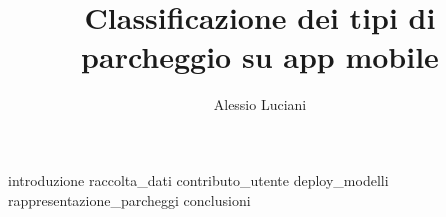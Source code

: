 \documentclass[binding=0.6cm,Lau,noexaminfo]{sapthesis}
\title{Classificazione dei tipi di parcheggio su app mobile} \author{Alessio Luciani}
\begin{document}
\frontmatter
\maketitle
\dedication{Alla mia famiglia}
\tableofcontents
\mainmatter
\large
{introduzione}
{raccolta_dati}
{contributo_utente}
{deploy_modelli}
{rappresentazione_parcheggi}
{conclusioni}
\backmatter
\cleardoublepage
{} %


\end{document}
